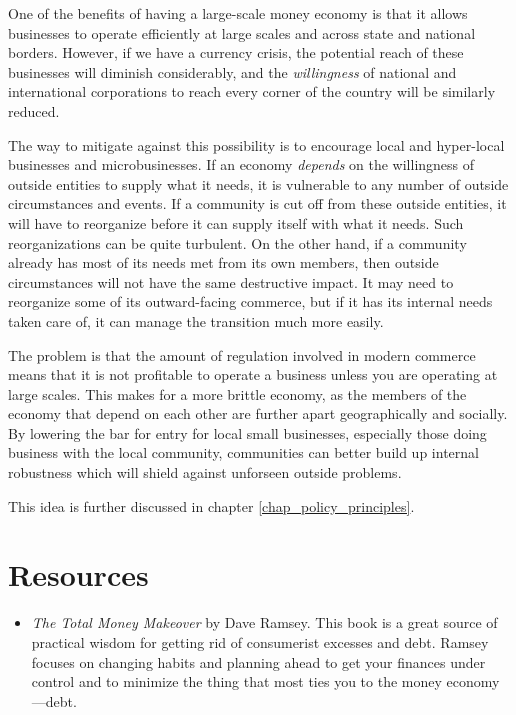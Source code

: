 \begin{policynote}
One of the benefits of having a large-scale money economy is that it
allows businesses to operate efficiently at large scales and across
state and national borders.  However, if we have a currency crisis, 
the potential reach of these businesses will diminish considerably,
and the \textit{willingness} of national and international corporations to 
reach every corner of the country will be similarly reduced.

The way to mitigate against this possibility is to encourage local and
hyper-local businesses and microbusinesses.  If an economy \textit{depends}
on the willingness of outside entities to supply what it needs, it is 
vulnerable to any number of outside circumstances and events.  If a 
community is cut off from these outside entities, it will have to reorganize
before it can supply itself with what it needs.  Such reorganizations can
be quite turbulent.  On the other hand, if a community already has
most of its needs met from its own members, then outside circumstances
will not have the same destructive impact.  It may need to reorganize
some of its outward-facing commerce, but if it has its internal needs
taken care of, it can manage the transition much more easily.

The problem is that the amount of regulation involved in modern commerce
means that it is not profitable to operate a business unless you are 
operating at large scales.  This makes for a more brittle economy, as
the members of the economy that depend on each other are further apart
geographically and socially.  By lowering the bar for entry for 
local small businesses, especially those doing business with the 
local community, communities can better build up 
internal robustness which will shield against unforseen outside problems.

This idea is further discussed in chapter \ref{chap_policy_principles}.
\end{policynote}

\section{Resources}
\begin{itemize}
\item 
\textit{The Total Money Makeover} by Dave Ramsey.  This book is a great source of practical wisdom 
for getting rid of consumerist excesses and debt.  Ramsey focuses on changing habits and planning
ahead to get your finances under control and to minimize the thing that most ties you to the money
economy---debt.
\end{itemize}
